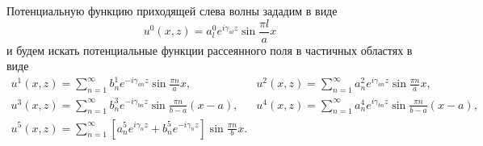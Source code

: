 Потенциальную функцию приходящей слева волны зададим в виде
$$
	u^0(x, z) = a_l^0 e^{i\gamma_{al}z}\sin{\frac{\pi l}{a}x}
$$
и будем искать потенциальные функции рассеянного поля в частичных областях в виде
$$
	\begin{array}{ll}
	u^1(x, z)=\sum\limits_{n=1}^{\infty}b_n^1e^{-i\gamma_{an}z}\sin{\frac{\pi n}{a}x},&
	u^2(x, z)=\sum\limits_{n=1}^{\infty}a_n^2e^{i\gamma_{an}z}\sin{\frac{\pi n}{a}x},\\
	u^3(x, z)=\sum\limits_{n=1}^{\infty}b_n^3e^{-i\gamma_{bn}z}\sin{\frac{\pi n}{b-a}(x-a)},&
	u^4(x, z)=\sum\limits_{n=1}^{\infty}a_n^4e^{i\gamma_{bn}z}\sin{\frac{\pi n}{b-a}(x-a)},\\
	u^5(x, z)=\sum\limits_{n=1}^{\infty}\left[a_n^5e^{i\gamma_{n}z}+b_n^5e^{-i\gamma_{n}z}\right]\sin{\frac{\pi n}{b}x}.&\\
	\end{array}
$$